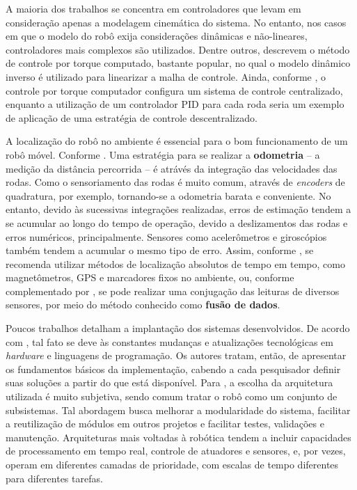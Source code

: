 A maioria dos trabalhos se concentra em controladores que levam em consideração apenas a modelagem cinemática do sistema. No entanto, nos casos em que o modelo do robô exija considerações dinâmicas e não-lineares, controladores mais complexos são utilizados. Dentre outros, \cite{siciliano2016springer} descrevem o método de controle por torque computado, bastante popular, no qual o modelo dinâmico inverso é utilizado para linearizar a malha de controle. Ainda, conforme \cite{indiveri2009swedish}, o controle por torque computador configura um sistema de controle centralizado, enquanto a utilização de um controlador PID para cada roda seria um exemplo de aplicação de uma estratégia de controle descentralizado.

A localização do robô no ambiente é essencial para o bom funcionamento de um robô móvel. Conforme \cite{lynch2017modern}. Uma estratégia para se realizar a \textbf{odometria} -- a medição da distância percorrida -- é atrávés da integração das velocidades das rodas. Como o sensoriamento das rodas é muito comum, através de \textit{encoders} de quadratura, por exemplo, tornando-se a odometria barata e conveniente. No entanto, devido às sucessivas integrações realizadas, erros de estimação tendem a se acumular ao longo do tempo de operação, devido a deslizamentos das rodas e erros numéricos, principalmente. Sensores como acelerômetros e giroscópios também tendem a acumular o mesmo tipo de erro. Assim, conforme \cite{siegwart2011introduction}, se recomenda utilizar métodos de localização absolutos de tempo em tempo, como magnetômetros, GPS e marcadores fixos no ambiente, ou, conforme complementado por \cite{lynch2017modern}, se pode realizar uma conjugação das leituras de diversos sensores, por meio do método conhecido como \textbf{fusão de dados}.



Poucos trabalhos detalham a implantação dos sistemas desenvolvidos. De acordo com \cite{craig2017introduction}, tal fato se deve às constantes mudanças e atualizações tecnológicas em \textit{hardware} e linguagens de programação. Os autores tratam, então, de apresentar os fundamentos básicos da implementação, cabendo a cada pesquisador definir suas soluções a partir do que está disponível. Para \cite{siciliano2016springer}, a escolha da arquitetura utilizada é muito subjetiva, sendo comum tratar o robô como um conjunto de subsistemas. Tal abordagem busca melhorar a modularidade do sistema, facilitar a reutilização de módulos em outros projetos e facilitar testes, validações e manutenção. Arquiteturas mais voltadas à robótica tendem a incluir capacidades de processamento em  tempo real, controle de atuadores e sensores, e, por vezes, operam em diferentes camadas de prioridade, com escalas de tempo diferentes para diferentes tarefas.

